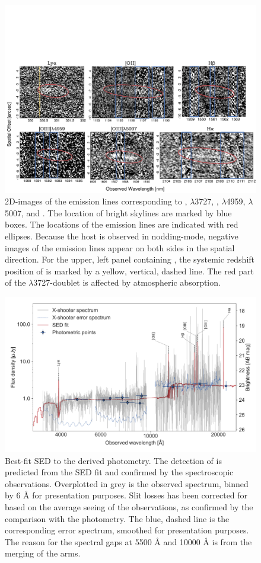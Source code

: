 \documentclass[referee]{aa}
\begin{document}
\begin{figure}
	\centering
	\includegraphics[width=18cm]{figures/grid.pdf}
	\caption{2D-images of the emission lines corresponding to \lya, \oii$\lambda$3727, \hb, \oiii$\lambda$4959, \oiii$\lambda$5007, and \ha. The location of bright skylines are marked by blue boxes. The locations of the emission lines are indicated with red ellipses. Because the host is observed in nodding-mode, negative images of the emission lines appear on both sides in the spatial direction. For the upper, left panel containing \lya, the systemic redshift position of \lya{} is marked by a yellow, vertical, dashed line. The red part of the \oii$\lambda$3727-doublet is affected by atmospheric absorption.}
	\label{fig:line}
\end{figure}


\begin{figure}
	\centering
	\includegraphics[width=16cm]{figures/SEDspecphot.pdf}
	\caption{Best-fit SED to the derived photometry. The detection of \lya{}  is predicted from the SED fit and confirmed by the spectroscopic observations. Overplotted in grey is the observed spectrum, binned by 6 \AA{} for presentation purposes. Slit losses has been corrected for based on the average seeing of the observations, as confirmed by the comparison with the photometry. The blue, dashed line is the corresponding error spectrum, smoothed for presentation purposes. The reason for the spectral gaps at 5500 \AA{} and 10000 \AA{} is from the merging of the arms.}
	\label{fig:SED}
\end{figure}
\end{document}
